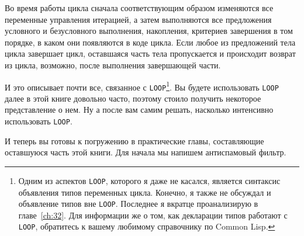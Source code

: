 Во время работы цикла сначала соответствующим образом изменяются все переменные управления
итерацией, а затем выполняются все предложения условного и безус\-лов\-но\-го выполнения,
накопления, критериев завершения в том порядке, в каком они появляются в коде цикла. Если
любое из предложений тела цикла завершает цикл, оставшаяся часть тела пропускается и
происходит возврат из цикла, возможно, после выполнения завершающей части.

И это описывает почти все, связанное с \lstinline{LOOP}\footnote{Одним из аспектов
  \lstinline{LOOP}, которого я даже не касался, является синтаксис объявления типов
  переменных цикла. Конечно, я также не обсуждал и объявление типов вне
  \lstinline{LOOP}. Последнее я вкратце проанализирую в главе~\ref{ch:32}. Для информации же о том,
  как декларации типов работают с \lstinline{LOOP}, обратитесь к вашему любимому справочнику
  по Common Lisp.}\hspace{\footnotenegspace}. Вы будете использовать \lstinline{LOOP} далее в этой книге довольно
часто, поэтому стоило получить некоторое представление о нем. Ну а после вам самим решать,
насколько интенсивно использовать \lstinline{LOOP}.

И теперь вы готовы к погружению в практические главы, составляющие оставшуюся часть этой
книги. Для начала мы напишем антиспамовый фильтр.



